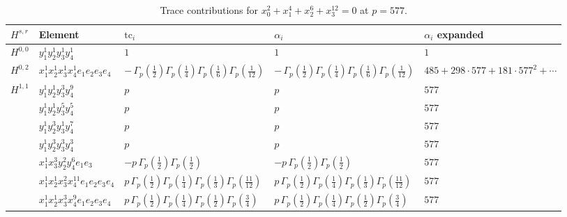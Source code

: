 \documentclass[11pt]{article}
\begin{document}
\begin{table}[ht]
\centering
\caption{Trace contributions for $x_0^{2} + x_1^{4} + x_2^{6} + x_3^{12} = 0$ at $p=577$.}\label{tab:diagonal-7}
\renewcommand{\arraystretch}{1.1}
{\scriptsize
\begin{tabular}{@{}lllll@{}}
\toprule
$H^{s,r}$ & Element & $\mathrm{tc}_i$ & $\alpha_i$ & $\alpha_i$ expanded \\
\midrule
$H^{0,0}$ & $y_{1}^{1} y_{2}^{1} y_{3}^{1} y_{4}^{1}$ & $1$ & $1$ & $1$ \\
\midrule
$H^{0,2}$ & $x_{1}^{1} x_{2}^{1} x_{3}^{1} x_{4}^{1}  e_{1} e_{2} e_{3} e_{4}$ & $- \, \Gamma_p \left( \frac{1}{2} \right) \Gamma_p \left( \frac{1}{4} \right) \Gamma_p \left( \frac{1}{6} \right) \Gamma_p \left( \frac{1}{12} \right)$ & $- \, \Gamma_p \left( \frac{1}{2} \right) \Gamma_p \left( \frac{1}{4} \right) \Gamma_p \left( \frac{1}{6} \right) \Gamma_p \left( \frac{1}{12} \right)$ & $485{+}298{\cdot}577{+}181{\cdot}577^{2}{+}\cdots$ \\
\midrule
$H^{1,1}$ & $y_{1}^{1} y_{2}^{1} y_{3}^{3} y_{4}^{9}$ & $p \,$ & $p \,$ & $577$ \\
 & $y_{1}^{1} y_{2}^{1} y_{3}^{5} y_{4}^{5}$ & $p \,$ & $p \,$ & $577$ \\
 & $y_{1}^{1} y_{2}^{3} y_{3}^{1} y_{4}^{7}$ & $p \,$ & $p \,$ & $577$ \\
 & $y_{1}^{1} y_{2}^{3} y_{3}^{3} y_{4}^{3}$ & $p \,$ & $p \,$ & $577$ \\
 & $x_{1}^{1} x_{3}^{3} y_{2}^{2} y_{4}^{6} e_{1} e_{3}$ & $- p \, \Gamma_p \left( \frac{1}{2} \right) \Gamma_p \left( \frac{1}{2} \right)$ & $- p \, \Gamma_p \left( \frac{1}{2} \right) \Gamma_p \left( \frac{1}{2} \right)$ & $577$ \\
 & $x_{1}^{1} x_{2}^{1} x_{3}^{2} x_{4}^{11}  e_{1} e_{2} e_{3} e_{4}$ & $p \, \Gamma_p \left( \frac{1}{2} \right) \Gamma_p \left( \frac{1}{4} \right) \Gamma_p \left( \frac{1}{3} \right) \Gamma_p \left( \frac{11}{12} \right)$ & $p \, \Gamma_p \left( \frac{1}{2} \right) \Gamma_p \left( \frac{1}{4} \right) \Gamma_p \left( \frac{1}{3} \right) \Gamma_p \left( \frac{11}{12} \right)$ & $577$ \\
 & $x_{1}^{1} x_{2}^{1} x_{3}^{3} x_{4}^{9}  e_{1} e_{2} e_{3} e_{4}$ & $p \, \Gamma_p \left( \frac{1}{2} \right) \Gamma_p \left( \frac{1}{4} \right) \Gamma_p \left( \frac{1}{2} \right) \Gamma_p \left( \frac{3}{4} \right)$ & $p \, \Gamma_p \left( \frac{1}{2} \right) \Gamma_p \left( \frac{1}{4} \right) \Gamma_p \left( \frac{1}{2} \right) \Gamma_p \left( \frac{3}{4} \right)$ & $577$ \\

\end{tabular}}
\end{table}
\end{document}
